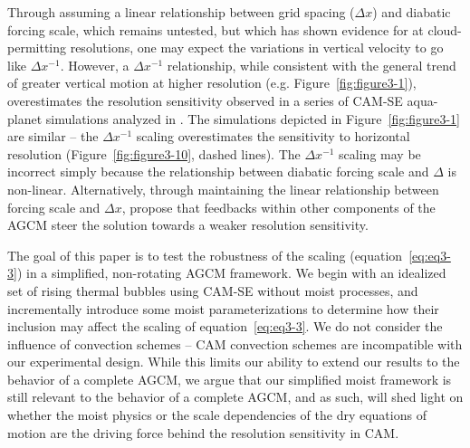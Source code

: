 Through assuming a linear relationship between grid spacing ($\Delta x$) and diabatic forcing scale, which remains untested, but which \cite{J2017JAMES} has shown evidence for at cloud-permitting resolutions, one may expect the variations in vertical velocity to go like $\Delta x^{-1}$. However, a $\Delta x^{-1}$ relationship, while consistent with the general trend of greater vertical motion at higher resolution (e.g. Figure~\ref{fig:figure3-1}), overestimates the resolution sensitivity observed in a series of CAM-SE aqua-planet simulations analyzed in \cite{HR2017JCLIM}. The simulations depicted in Figure~\ref{fig:figure3-1} are similar – the  $\Delta x^{-1}$ scaling overestimates the sensitivity to horizontal resolution (Figure~\ref{fig:figure3-10}, dashed lines). The $\Delta x^{-1}$ scaling may be incorrect simply because the relationship between diabatic forcing scale and $\Delta$ is non-linear. Alternatively, through maintaining the linear relationship between forcing scale and $\Delta x$, \cite{HR2017JCLIM} propose that feedbacks within other components of the AGCM steer the solution towards a weaker resolution sensitivity.
 
The goal of this paper is to test the robustness of the scaling (equation~\ref{eq:eq3-3}) in a simplified, non-rotating AGCM framework. We begin with an idealized set of rising thermal bubbles using CAM-SE without moist processes, and incrementally introduce some moist parameterizations to determine how their inclusion may affect the scaling of equation~\ref{eq:eq3-3}. We do not consider the influence of convection schemes – CAM convection schemes are incompatible with our experimental design. While this limits our ability to extend our results to the behavior of a complete AGCM, we argue that our simplified moist framework is still relevant to the behavior of a complete AGCM, and as such, will shed light on whether the moist physics or the scale dependencies of the dry equations of motion are the driving force behind the resolution sensitivity in CAM. 

